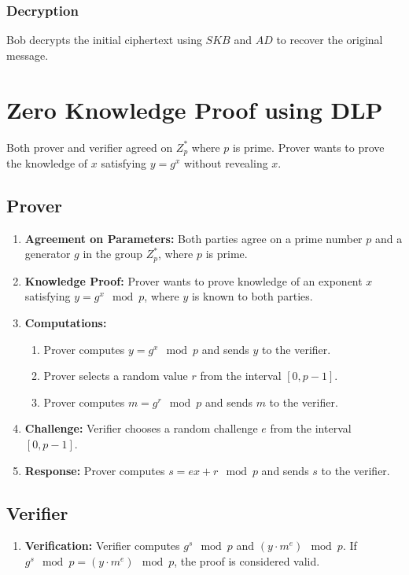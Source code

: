 \documentclass[11pt]{article}
\begin{document}
\subsubsection{ Decryption}
Bob decrypts the initial ciphertext using \( SKB \) and \( AD \) to recover the original message.

\section{Zero Knowledge Proof using DLP}
Both prover and verifier agreed on $Z^*_p$ where $p$ is prime. Prover wants to prove the knowledge of $x$ satisfying $y = g^x$ without revealing $x$.

\subsection{Prover}
\begin{enumerate}
    \item \textbf{Agreement on Parameters:} Both parties agree on a prime number $p$ and a generator $g$ in the group $Z^*_p$, where $p$ is prime.
    \item \textbf{Knowledge Proof:} Prover wants to prove knowledge of an exponent $x$ satisfying $y = g^x \mod p$, where $y$ is known to both parties.
    \item \textbf{Computations:}
    \begin{enumerate}
        \item Prover computes $y = g^x \mod p$ and sends $y$ to the verifier.
        \item Prover selects a random value $r$ from the interval $[0, p-1]$.
        \item Prover computes $m = g^r \mod p$ and sends $m$ to the verifier.
    \end{enumerate}
    \item \textbf{Challenge:} Verifier chooses a random challenge $e$ from the interval $[0, p-1]$.
    \item \textbf{Response:} Prover computes $s = ex + r \mod p$ and sends $s$ to the verifier.
\end{enumerate}

\subsection*{Verifier}
\begin{enumerate}
    \item \textbf{Verification:} Verifier computes $g^s \mod p$ and $(y \cdot m^e) \mod p$. If $g^s \mod p = (y \cdot m^e) \mod p$, the proof is considered valid.
\end{enumerate}
\end{document}
